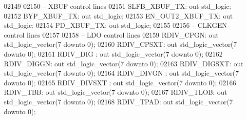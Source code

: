\begin{DoxyCode}
02149 
02150 \textcolor{keyword}{    -- XBUF control lines}
02151     SLFB\_XBUF\_TX:   \textcolor{keywordflow}{out} \textcolor{comment}{std\_logic};
02152     BYP\_XBUF\_TX:    \textcolor{keywordflow}{out} \textcolor{comment}{std\_logic};
02153     EN\_OUT2\_XBUF\_TX:    \textcolor{keywordflow}{out} \textcolor{comment}{std\_logic};
02154     PD\_XBUF\_TX: \textcolor{keywordflow}{out} \textcolor{comment}{std\_logic};
02155 
02156 \textcolor{keyword}{    -- CLKGEN control lines }
02157         
02158 \textcolor{keyword}{    -- LDO control lines    }
02159     RDIV\_CPGN:  \textcolor{keywordflow}{out} \textcolor{comment}{std\_logic\_vector}(\textcolor{vhdllogic}{}\textcolor{vhdllogic}{7} \textcolor{keywordflow}{downto} \textcolor{vhdllogic}{}\textcolor{vhdllogic}{0});
02160     RDIV\_CPSXT: \textcolor{keywordflow}{out} \textcolor{comment}{std\_logic\_vector}(\textcolor{vhdllogic}{}\textcolor{vhdllogic}{7} \textcolor{keywordflow}{downto} \textcolor{vhdllogic}{}\textcolor{vhdllogic}{0});
02161     RDIV\_DIG :  \textcolor{keywordflow}{out} \textcolor{comment}{std\_logic\_vector}(\textcolor{vhdllogic}{}\textcolor{vhdllogic}{7} \textcolor{keywordflow}{downto} \textcolor{vhdllogic}{}\textcolor{vhdllogic}{0});
02162     RDIV\_DIGGN: \textcolor{keywordflow}{out} \textcolor{comment}{std\_logic\_vector}(\textcolor{vhdllogic}{}\textcolor{vhdllogic}{7} \textcolor{keywordflow}{downto} \textcolor{vhdllogic}{}\textcolor{vhdllogic}{0});
02163     RDIV\_DIGSXT:    \textcolor{keywordflow}{out} \textcolor{comment}{std\_logic\_vector}(\textcolor{vhdllogic}{}\textcolor{vhdllogic}{7} \textcolor{keywordflow}{downto} \textcolor{vhdllogic}{}\textcolor{vhdllogic}{0});
02164     RDIV\_DIVGN :    \textcolor{keywordflow}{out} \textcolor{comment}{std\_logic\_vector}(\textcolor{vhdllogic}{}\textcolor{vhdllogic}{7} \textcolor{keywordflow}{downto} \textcolor{vhdllogic}{}\textcolor{vhdllogic}{0});
02165     RDIV\_DIVSXT :   \textcolor{keywordflow}{out} \textcolor{comment}{std\_logic\_vector}(\textcolor{vhdllogic}{}\textcolor{vhdllogic}{7} \textcolor{keywordflow}{downto} \textcolor{vhdllogic}{}\textcolor{vhdllogic}{0});
02166     RDIV\_TBB:   \textcolor{keywordflow}{out} \textcolor{comment}{std\_logic\_vector}(\textcolor{vhdllogic}{}\textcolor{vhdllogic}{7} \textcolor{keywordflow}{downto} \textcolor{vhdllogic}{}\textcolor{vhdllogic}{0});
02167     RDIV\_TLOB:  \textcolor{keywordflow}{out} \textcolor{comment}{std\_logic\_vector}(\textcolor{vhdllogic}{}\textcolor{vhdllogic}{7} \textcolor{keywordflow}{downto} \textcolor{vhdllogic}{}\textcolor{vhdllogic}{0});
02168     RDIV\_TPAD:  \textcolor{keywordflow}{out} \textcolor{comment}{std\_logic\_vector}(\textcolor{vhdllogic}{}\textcolor{vhdllogic}{7} \textcolor{keywordflow}{downto} \textcolor{vhdllogic}{}\textcolor{vhdllogic}{0});

\end{DoxyCode}
